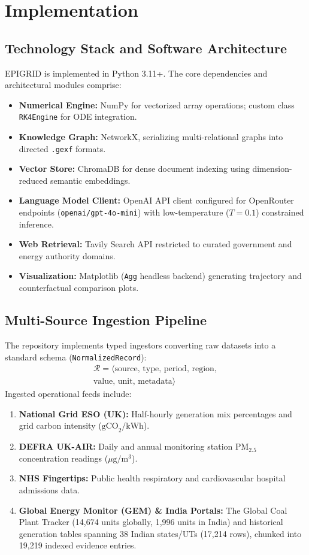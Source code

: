 \documentclass[conference]{IEEEtran}
\renewcommand{\_}{\textunderscore\allowbreak{}}%
\begin{document}
\section{Implementation}

\subsection{Technology Stack and Software Architecture}
EPIGRID is implemented in Python 3.11+. The core dependencies and architectural modules comprise:
\begin{itemize}
    \item \textbf{Numerical Engine:} NumPy for vectorized array operations; custom class \texttt{RK4Engine} for ODE integration.
    \item \textbf{Knowledge Graph:} NetworkX, serializing multi-relational graphs into directed \texttt{.gexf} formats.
    \item \textbf{Vector Store:} ChromaDB for dense document indexing using dimension-reduced semantic embeddings.
    \item \textbf{Language Model Client:} OpenAI API client configured for OpenRouter endpoints (\texttt{openai/gpt-4o-mini}) with low-temperature ($T=0.1$) constrained inference.
    \item \textbf{Web Retrieval:} Tavily Search API restricted to curated government and energy authority domains.
    \item \textbf{Visualization:} Matplotlib (\texttt{Agg} headless backend) generating trajectory and counterfactual comparison plots.
\end{itemize}

\subsection{Multi-Source Ingestion Pipeline}
The repository implements typed ingestors converting raw datasets into a standard schema (\texttt{NormalizedRecord}):
\begin{multline}
\mathcal{R} = \langle \text{source}, \, \text{type}, \, \text{period}, \, \text{region}, \\
\text{value}, \, \text{unit}, \, \text{metadata} \rangle
\end{multline}
Ingested operational feeds include:
\begin{enumerate}
    \item \textbf{National Grid ESO (UK):} Half-hourly generation mix percentages and grid carbon intensity ($\text{gCO}_2/\text{kWh}$).
    \item \textbf{DEFRA UK-AIR:} Daily and annual monitoring station $\text{PM}_{2.5}$ concentration readings ($\mu\text{g}/\text{m}^3$).
    \item \textbf{NHS Fingertips:} Public health respiratory and cardiovascular hospital admissions data.
    \item \textbf{Global Energy Monitor (GEM) \& India Portals:} The Global Coal Plant Tracker (14,674 units globally, 1,996 units in India) and historical generation tables spanning 38 Indian states/UTs (17,214 rows), chunked into 19,219 indexed evidence entries.
\end{enumerate}
\end{document}

